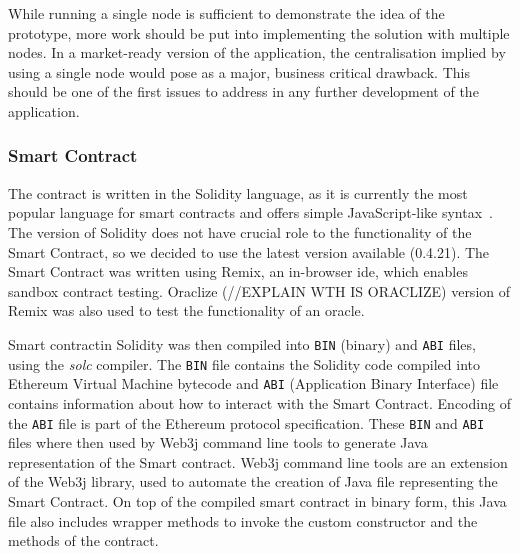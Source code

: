 While running a single node is sufficient to demonstrate the idea of the prototype, more work should be put into implementing the solution with multiple nodes. In a market-ready version of the application, the centralisation implied by using a single node would pose as a major, business critical drawback. This should be one of the first issues to address in any further development of the application.
% 
% 
\subsubsection{Smart Contract}
The contract is written in the Solidity language, as it is currently the most popular language for smart contracts and offers simple JavaScript-like syntax~\cite{Tikhomirov2018Ethereum:Perspectives}. The version of Solidity does not have crucial role to the functionality of the Smart Contract, so we decided to use the latest version available (0.4.21)\footnotemark. The Smart Contract was written using Remix, an in-browser \acrshort{ide}, which enables sandbox contract testing. Oraclize (//EXPLAIN WTH IS ORACLIZE) version of Remix was also used to test the functionality of an oracle.
% 

Smart contract\footnotemark in Solidity was then compiled into \texttt{BIN} (binary) and \texttt{ABI} files, using the \textit{solc} compiler.
% 
% 
The \texttt{BIN} file contains the Solidity code compiled into Ethereum Virtual Machine bytecode and \texttt{ABI} (Application Binary Interface) file contains information about how to interact with the Smart Contract. Encoding of the \texttt{ABI} file is part of the Ethereum protocol specification\footnotemark. These \texttt{BIN} and \texttt{ABI} files where then used by Web3j command line tools to generate Java representation of the Smart contract\footnotemark.
% 
% 
Web3j command line tools are an extension of the Web3j library, used to automate the creation of Java file representing the Smart Contract. On top of the compiled smart contract in binary form, this Java file also includes wrapper methods to invoke the custom constructor and the methods of the contract.
% 
% 
% 
% 
